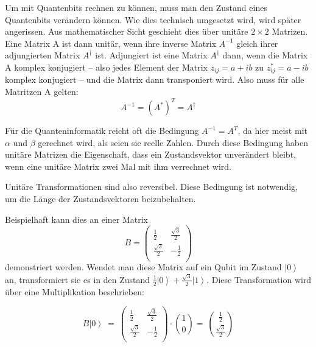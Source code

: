 Um mit Quantenbits rechnen zu können, muss man den Zustand eines Quantenbits verändern können. Wie dies technisch umgesetzt wird, wird später angerissen. Aus mathematischer Sicht geschieht dies über unitäre $2\times2$ Matrizen. \\

Eine Matrix A ist dann unitär, wenn ihre inverse Matrix $A^{-1}$ gleich ihrer adjungierten Matrix $A^\dag$ ist. Adjungiert ist eine Matrix $A^\dag$ dann, wenn die Matrix A komplex konjugiert – also jedes Element der Matrix $z_{ij}=a+ib$ zu $z_{ij}^\ast=a-ib$ komplex konjugiert – und die Matrix dann transponiert wird. Also muss für alle Matritzen A gelten:
\begin{equation}
    A^{-1}=(A^*)^T=A^\dag
\end{equation}

Für die Quanteninformatik reicht oft die Bedingung $A^{-1}=A^T$, da hier meist mit $\alpha$ und $\beta$ gerechnet wird, als seien sie reelle Zahlen. Durch diese Bedingung haben unitäre Matrizen die Eigenschaft, dass ein Zustandsvektor unverändert bleibt, wenn eine unitäre Matrix zwei Mal mit ihm verrechnet wird. 

Unitäre Transformationen sind also reversibel. Diese Bedingung ist notwendig, um die Länge der Zustandsvektoren beizubehalten.

Beispielhaft kann dies an einer Matrix 
\begin{equation}
    B=\left(\begin{matrix}\frac{1}{2}&\frac{\sqrt3}{2}\\\frac{\sqrt3}{2}&-\frac{1}{2}\\\end{matrix}\right)
\end{equation} demonstriert werden. Wendet man diese Matrix auf ein Qubit im Zustand $\left|0\right\rangle$ an, transformiert sie es in den Zustand $\frac{1}{2}\left|0\right\rangle+\frac{\sqrt3}{2}\left|1\right\rangle$. Diese Transformation wird über eine Multiplikation beschrieben:

\begin{equation}
    B\left|\left.0\right\rangle\ =\ \right.\left(\begin{matrix}\frac{1}{2}&\frac{\sqrt3}{2}\\\frac{\sqrt3}{2}&-\frac{1}{2}\\\end{matrix}\right)\cdot\binom{1}{0}=\ \binom{\frac{1}{2}}{\frac{\sqrt3}{2}}
\end{equation}

